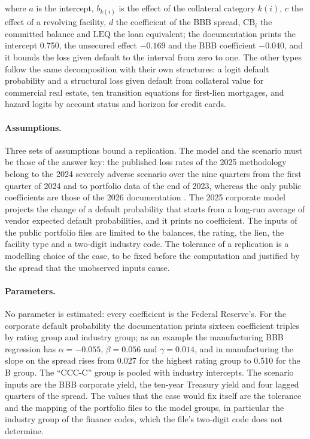 where $a$ is the intercept, $b_{k(i)}$ is the effect of the collateral category $k(i)$, $c$ the effect of a revolving facility,
$d$ the coefficient of the BBB spread, $\mathrm{CB}_i$ the committed balance and $\mathrm{LEQ}$ the loan equivalent; the
documentation prints the intercept 0.750, the unsecured effect $-0.169$ and the BBB coefficient $-0.040$, and it bounds the loss
given default to the interval from zero to one. The other types follow the same decomposition with their own structures: a logit default probability and a
structural loss given default from collateral value for commercial real estate, ten transition equations for first-lien
mortgages, and hazard logits by account status and horizon for credit cards.

\paragraph{Assumptions.}
Three sets of assumptions bound a replication. The model and the scenario must be those of the answer key: the published loss
rates of the 2025 methodology belong to the 2024 severely adverse scenario over the nine quarters from the first quarter of 2024
and to portfolio data of the end of 2023, whereas the only public coefficients are those of the 2026 documentation
\citep{lgd-ead:fedmethod2025,aggregation-stress:fedcredit2026}. The 2025 corporate model projects the change of a
default probability that starts from a long-run average of vendor expected default probabilities, and it prints no coefficient.
The inputs of the public portfolio files are limited to the balances, the rating, the lien, the facility type and a two-digit
industry code. The tolerance of a replication is a modelling choice of the case, to be fixed before the computation and
justified by the spread that the unobserved inputs cause.

\paragraph{Parameters.}
No parameter is estimated: every coefficient is the Federal Reserve's. For the corporate default probability the documentation
prints sixteen coefficient triples by rating group and industry group; as an example the manufacturing BBB regression has
$\alpha=-0.055$, $\beta=0.056$ and $\gamma=0.014$, and in manufacturing the slope on the spread rises from 0.027 for the
highest rating group to 0.510 for the B group. The ``CCC-C'' group is pooled with industry intercepts. The scenario inputs are the BBB corporate
yield, the ten-year Treasury yield and four lagged quarters of the spread. The values that the case would fix itself are the
tolerance and the mapping of the portfolio files to the model groups, in particular the industry group of the finance codes,
which the file's two-digit code does not determine.

